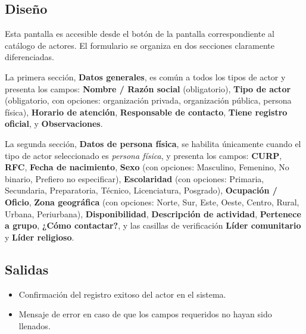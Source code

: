 \subsection{Diseño}
Esta pantalla  es accesible desde 
el botón  de la pantalla correspondiente al catálogo 
de actores. El formulario se organiza en dos secciones claramente diferenciadas.

La primera sección, \textbf{Datos generales}, es común a todos los tipos de 
actor y presenta los campos: \textbf{Nombre / Razón social} (obligatorio), 
\textbf{Tipo de actor} (obligatorio, con opciones: organización privada, 
organización pública, persona física), \textbf{Horario de atención}, 
\textbf{Responsable de contacto}, \textbf{Tiene registro oficial}, y 
\textbf{Observaciones}.

La segunda sección, \textbf{Datos de persona física}, se habilita únicamente 
cuando el tipo de actor seleccionado es \textit{persona física}, y presenta los 
campos: \textbf{CURP}, \textbf{RFC}, \textbf{Fecha de nacimiento}, 
\textbf{Sexo} (con opciones: Masculino, Femenino, No binario, Prefiero no 
especificar), \textbf{Escolaridad} (con opciones: Primaria, Secundaria, 
Preparatoria, Técnico, Licenciatura, Posgrado), \textbf{Ocupación / Oficio}, 
\textbf{Zona geográfica} (con opciones: Norte, Sur, Este, Oeste, Centro, Rural, 
Urbana, Periurbana), \textbf{Disponibilidad}, \textbf{Descripción de 
	actividad}, \textbf{Pertenece a grupo}, \textbf{¿Cómo contactar?}, y las 
casillas de verificación \textbf{Líder comunitario} y \textbf{Líder religioso}.

\subsection{Salidas}
\begin{itemize}
	\item Confirmación del registro exitoso del actor en el sistema.
	\item Mensaje de error  en caso 
	de que los campos requeridos no hayan sido llenados.
\end{itemize}
